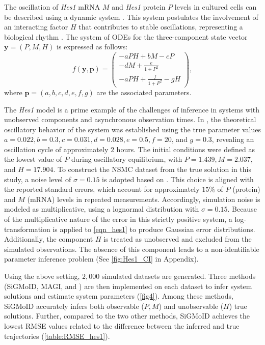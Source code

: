\documentclass[letterpaper]{article} %
\theoremstyle{thmstyleone}%
\theoremstyle{thmstyletwo}%
\theoremstyle{thmstylethree}%
\begin{document}
The oscillation of \textit{Hes1} mRNA $M$ and \textit{Hes1} protein $P$ levels in cultured cells can be described using a dynamic system \cite{hirata2002oscillatory}. This system postulates the involvement of an interacting factor $H$ that contributes to stable oscillations, representing a biological rhythm \cite{forger2024biological}. The system of ODEs for the three-component state vector $\mathbf{y} = (P, M, H)$ is expressed as follows:
\begin{equation}
f(\mathbf{y},\mathbf{p})=\begin{pmatrix}
-aPH+bM-cP \\
-dM+\frac{e}{1+P^2} \\
-aPH+\frac{f}{1+P^2}-gH
\end{pmatrix},\label{eqn_hes1}
\end{equation}
where $\mathbf{p}=(a,b,c,d,e,f,g)$ are the associated parameters.

The \textit{Hes1} model is a prime example of the challenges of inference in systems with unobserved components and asynchronous observation times. In \cite{hirata2002oscillatory}, the theoretical oscillatory behavior of the system was established using the true parameter values $a = 0.022, b = 0.3, c = 0.031, d = 0.028, e = 0.5, f = 20$, and $g = 0.3$, revealing an oscillation cycle of approximately $2$ hours. The initial conditions were defined as the lowest value of $P$ during oscillatory equilibrium, with $P = 1.439, M = 2.037$, and $H = 17.904$. To construct the NSMC dataset from the true solution in this study, a noise level of $\sigma = 0.15$ is adopted based on \cite{yang2021inference}. This choice is aligned with the reported standard errors, which account for approximately $15\%$ of $P$ (protein) and $M$ (mRNA) levels in repeated measurements. Accordingly, simulation noise is modeled as multiplicative, using a lognormal distribution with $\sigma = 0.15$. Because of the multiplicative nature of the error in this strictly positive system, a log-transformation is applied to \cref{eqn_hes1} to produce Gaussian error distributions. Additionally, the component $H$ is treated as unobserved and excluded from the simulated observations. The absence of this component leads to a non-identifiable parameter inference problem (See \cref{fig:Hes1_CI} in Appendix).

Using the above setting, $2,000$ simulated datasets are generated. Three methods (SiGMoID, MAGI, and \cite{ramsay2007parameter}) are then implemented on each dataset to infer system solutions and estimate system parameters (\cref{fig4}). Among these methods, SiGMoID accurately infers both observable ($P, M$) and unobservable ($H$) true solutions. Further, compared to the two other methods, SiGMoID achieves the lowest RMSE values related to the difference between the inferred and true trajectories (\cref{table:RMSE_hes1}).
\end{document}
